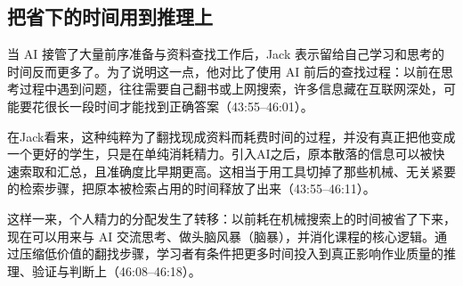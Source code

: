 \documentclass[UTF8,a4paper,11pt,fontset=fandol]{ctexart}
\begin{document}
\subsection{把省下的时间用到推理上}
当 AI 接管了大量前序准备与资料查找工作后，Jack 表示留给自己学习和思考的时间反而更多了。为了说明这一点，他对比了使用 AI 前后的查找过程：以前在思考过程中遇到问题，往往需要自己翻书或上网搜索，许多信息藏在互联网深处，可能要花很长一段时间才能找到正确答案（43:55–46:01）。

在Jack看来，这种纯粹为了翻找现成资料而耗费时间的过程，并没有真正把他变成一个更好的学生，只是在单纯消耗精力。引入AI之后，原本散落的信息可以被快速索取和汇总，且准确度比早期更高。这相当于用工具切掉了那些机械、无关紧要的检索步骤，把原本被检索占用的时间释放了出来（43:55–46:11）。

这样一来，个人精力的分配发生了转移：以前耗在机械搜索上的时间被省了下来，现在可以用来与 AI 交流思考、做头脑风暴（脑暴），并消化课程的核心逻辑。通过压缩低价值的翻找步骤，学习者有条件把更多时间投入到真正影响作业质量的推理、验证与判断上（46:08–46:18）。
\end{document}
